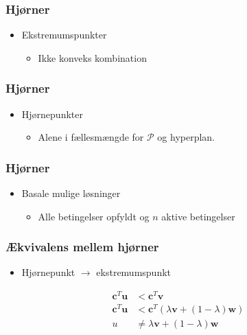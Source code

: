 %
\begin{frame}
\frametitle{Hjørner}
\begin{itemize}
\item Ekstremumspunkter
\begin{itemize}
\item Ikke konveks kombination
\end{itemize}
\end{itemize}
%

\end{frame}
%
%
\begin{frame}
\frametitle{Hjørner}
\begin{itemize}
\item Hjørnepunkter
\begin{itemize}
\item Alene i fællesmængde for $\mathcal{P}$ og hyperplan.
\end{itemize}
\end{itemize}
%

\end{frame}
%
%
\begin{frame}
\frametitle{Hjørner}
\begin{itemize}
\item Basale mulige løsninger
\begin{itemize}
\item Alle betingelser opfyldt og $n$ aktive betingelser
\end{itemize}
\end{itemize}
%

\end{frame}
%
%
\begin{frame}
\frametitle{Ækvivalens mellem hjørner}
\begin{itemize}
\item Hjørnepunkt $\rightarrow$ ekstremumspunkt
\end{itemize}
%
\begin{align*}
\textbf{c}^T\textbf{u} &< \textbf{c}^T\textbf{v}\\
\textbf{c}^T\textbf{u} &< \textbf{c}^T(\lambda\textbf{v} + (1-\lambda)\textbf{w})\\
u &\neq \lambda\textbf{v} + (1-\lambda)\textbf{w}
\end{align*}
\end{frame}
%
%

